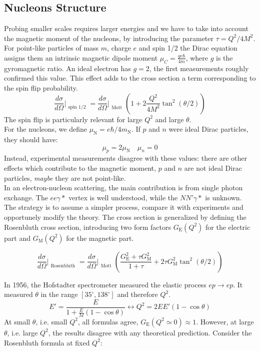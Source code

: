 \documentclass[10.75pt,a4paper,openright,bottom=2cm]{article}
\begin{document}
\subsection{Nucleons Structure}
Probing smaller scales requires larger energies and we have to take into account the magnetic moment of the nucleons, by introducing the parameter $\tau=Q^2/4M^2$. For point-like particles of mass $m$, charge $e$ and spin 1/2 the Dirac equation assigns them an intrinsic magnetic dipole moment $\mu_C=\frac{ge\hbar}{4m}$, where $g$ is the gyromagnetic ratio. An ideal electron has $g=2$, the first measurements roughly confirmed this value. This effect adds to the cross section a term corresponding to the spin flip probability.
\[
\frac{d\sigma}{d\Omega}\Bigr|_{\substack{\text{spin 1/2}}}=\frac{d\sigma}{d\Omega}\Bigr|_{\substack{\text{Mott}}}\left(1+2\frac{Q^2}{4M^2}\tan^2(\theta/2)\right)
\]
The spin flip is particularly relevant for large $Q^2$ and large $\theta$.\\
For the nucleons, we define $\mu_{\text{N}}=e\hbar/4m_{\text{N}}$. If $p$ and $n$ were ideal Dirac particles, they should have:
\[
\mu_p=2\mu_{\text{N}} \quad \mu_n=0
\]
Instead, experimental measurements disagree with these values: there are other effects which contribute to the magnetic moment, $p$ and $n$ are not ideal Dirac particles, \textit{maybe} they are not point-like.\\
In an electron-nucleon scattering, the main contribution is from single photon exchange. The $ee\gamma*$ vertex is well understood, while the $NN'\gamma*$ is unknown. The strategy is to assume a simpler process, compare it with experiments and opportunely modify the theory. The cross section is generalized by defining the Rosenbluth cross section, introducing two form factors $G_{\text{E}}(Q^2)$ for the electric part and $G_{\text{M}}(Q^2)$ for the magnetic part.
\begin{tcolorbox}[width=\textwidth,colback={yellow!50},title={Rosenbluth Cross Section},colbacktitle={gray!50},coltitle=black]
\[
\frac{d\sigma}{d\Omega}\Bigr|_{\substack{\text{Rosenbluth}}}=\frac{d\sigma}{d\Omega}\Bigr|_{\substack{\text{Mott}}}\left(\frac{G_{\text{E}}^2+\tau G_{\text{M}}^2}{1+\tau}+2\tau G_{\text{M}}^2\tan^2(\theta/2)\right)
\]
\end{tcolorbox}
\noindent
In 1956, the Hofstadter spectrometer measured the elastic process $ep\to ep$. It measured $\theta$ in the range $[35^\circ,138^\circ]$ and therefore $Q^2$.
\[
E'=\frac{E}{1+\frac{E}{M}(1-\cos\theta)}\leftrightarrow Q^2=2EE'(1-\cos\theta)
\]
At small $\theta$, i.e. small $Q^2$, all formulas agree, $G_{\text{E}}(Q^2\simeq0)\approx1$. However, at large $\theta$, i.e. large $Q^2$, the results disagree with any theoretical prediction. Consider the Rosenbluth formula at fixed $Q^2$:
\end{document}
